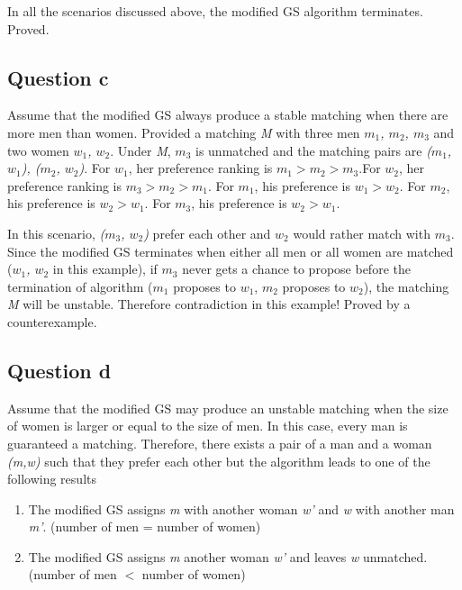 \documentclass{article}
\begin{document}
    In all the scenarios discussed above, the modified GS algorithm terminates. Proved.
    
    
    \subsection{Question c}
    
    Assume that the modified GS always produce a stable matching when there are more men than women. Provided a matching \textit{M} with three men \textit{$m_1$, $m_2$, $m_3$} and two women \textit{$w_1$, $w_2$}. Under \textit{M}, \textit{$m_3$} is unmatched and the matching pairs are \textit{($m_1$, $w_1$), ($m_2$, $w_2$)}.  For \textit{$w_1$}, her preference ranking is \textit{$m_1 > m_2 > m_3$}.For \textit{$w_2$}, her preference ranking is \textit{$m_3 > m_2 > m_1$}. For \textit{$m_1$}, his preference is \textit{$w_1 > w_2$}. For \textit{$m_2$}, his preference is \textit{$w_2 > w_1$}. For \textit{$m_3$}, his preference is \textit{$w_2 > w_1$}.
    
    In this scenario, \textit{($m_3$, $w_2$)} prefer each other and \textit{$w_2$} would rather match with \textit{$m_3$}. Since the modified GS terminates when either all men or all women are matched (\textit{$w_1$, $w_2$} in this example), if \textit{$m_3$} never gets a chance to propose before the termination of algorithm (\textit{$m_1$} proposes to \textit{$w_1$}, \textit{$m_2$} proposes to \textit{$w_2$}), the matching \textit{M} will be unstable. Therefore contradiction in this example! Proved by a counterexample.
    
    \subsection{Question d}
    
    Assume that the modified GS may produce an unstable matching when the size of women is larger or equal to the size of men. In this case, every man is guaranteed a matching. Therefore, there exists a pair of a man and a woman \textit{(m,w)} such that they prefer each other but the algorithm leads to one of the following results
    \begin{enumerate}
        \item The modified GS assigns \textit{m} with another woman \textit{w'} and \textit{w} with another man \textit{m'}. (number of men = number of women)
        \item The modified GS assigns \textit{m} another woman \textit{w'} and leaves \textit{w} unmatched. (number of men $<$ number of women)
    \end{enumerate}
    
\end{document}
